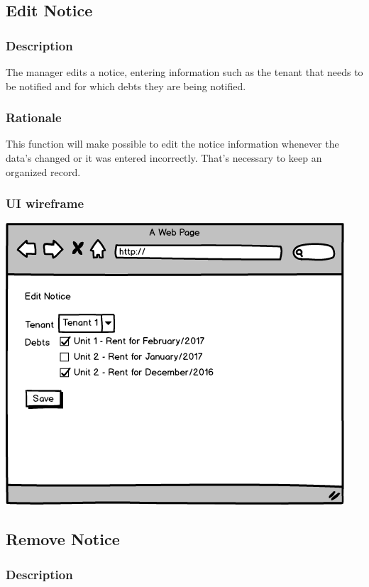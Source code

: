 \documentclass{scrreprt}
\begin{document}
\subsection{Edit Notice}
\subsubsection{Description}

The manager edits a notice, entering information such as the tenant that needs to be notified and for which debts they are being notified.

\subsubsection{Rationale}

This function will make possible to edit the notice information whenever the data's changed or it was entered incorrectly. That's necessary to keep an organized record.

\subsubsection{UI wireframe}
\includegraphics[scale=0.60]{mockups/editnotice.png}

\subsection{Remove Notice}
\subsubsection{Description}
\end{document}
